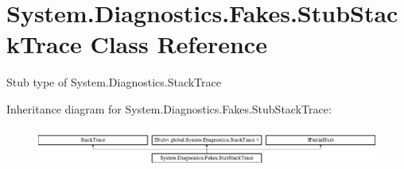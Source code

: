 \hypertarget{class_system_1_1_diagnostics_1_1_fakes_1_1_stub_stack_trace}{\section{System.\-Diagnostics.\-Fakes.\-Stub\-Stack\-Trace Class Reference}
\label{class_system_1_1_diagnostics_1_1_fakes_1_1_stub_stack_trace}
}


Stub type of System.\-Diagnostics.\-Stack\-Trace 


Inheritance diagram for System.\-Diagnostics.\-Fakes.\-Stub\-Stack\-Trace\-:\begin{figure}[H]
\begin{center}
\leavevmode
\includegraphics[height=1.300813cm]{class_system_1_1_diagnostics_1_1_fakes_1_1_stub_stack_trace}
\end{center}
\end{figure}
